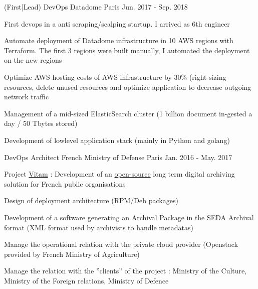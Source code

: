 \documentclass[12pt, a4paper]{awesome-cv}
\begin{document}
\begin{cventries}
  \cventry
    {(First|Lead) DevOps} 
    {Datadome} 
    {Paris} 
    {Jun. 2017 - Sep. 2018} 
    {
	  First devops in a anti scraping/scalping startup. I arrived as 6th engineer
	  \vspace{4.0mm}
      \begin{cvitems} %
        \item { Automate deployment of Datadome infrastructure in 10 AWS regions with Terraform. The first 3 regions were built manually, I automated the deployment on the new regions}
		\item { Optimize AWS hosting costs of AWS infrastructure by 30\% (right-sizing resources, delete unused resources and optimize application to decrease outgoing network traffic}
		\item { Management of a mid-sized ElasticSearch cluster (1 billion document in-gested a day / 50 Tbytes stored)}
		\item {	Development of lowlevel application stack (mainly in Python and golang)}
		\item { }
      \end{cvitems}
    }

  \cventry
    {DevOps Architect} 
    {French Ministry of Defense} 
    {Paris} 
    {Jan. 2016 - May. 2017} 
    {
	 Project \href{https://www.programmevitam.fr/}{Vitam} : Development of an \href{https://github.com/ProgrammeVitam/vitam}{open-source} long term digital archiving solution for French public organisations
	 \vspace{4.0mm}
      \begin{cvitems} %
       \item{ Design of deployment architecture (RPM/Deb packages)}
	   \item{ Development of a software generating an Archival Package in the SEDA Archival format (XML format used by archivists to handle metadatas)}
	   \item{ Manage the operational relation with the private cloud provider (Openstack provided by French Ministry of Agriculture)}
	   \item{ Manage the relation with the ”clients” of the project : Ministry of the Culture, Ministry of the Foreign relations, Ministry of Defence}
	   \item{ }
      \end{cvitems}
    }
	

\end{cventries}
\end{document}
